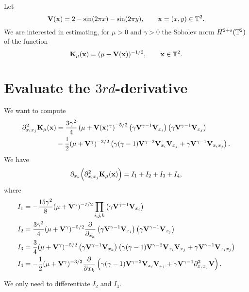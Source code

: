 
\noindent 
Let 
\begin{equation*}
    \mathbf{V}(\mathbf{x}) = 2-\sin(2\pi x) - \sin(2\pi y), \qquad \mathbf{x} = (x,y)\in \mathbb{T}^2.
\end{equation*}
We are interested in estimating, for $\mu>0$ and $\gamma > 0$ the Sobolev norm $H^{2+s}(\mathbb{T}^2)$ of the function
\begin{equation*}
    \mathbf{K}_\mu(\mathbf{x}) = (\mu + \mathbf{V}(\mathbf{x}))^{{-1/2}}, \qquad \mathbf{x}\in \mathbb{T}^2.
\end{equation*}

\section{Evaluate the $3rd$-derivative}
We want to compute 
\begin{align*}
    \partial^2_{x_ix_j} \mathbf{K}_\mu(\mathbf{x}) 
    &= \frac{3\gamma^2}{4}\left(\mu+\mathbf{V}(\mathbf{x})^\gamma\right)^{-5/2} 
        \left(\gamma \mathbf{V}^{\gamma-1} \mathbf{V}_{x_i}\right)
        \left(\gamma \mathbf{V}^{\gamma-1} \mathbf{V}_{x_j}\right) \\
    & -\frac{1}{2}(\mu + \mathbf{V}^\gamma)^{-3/2} 
        \left(
            \gamma(\gamma-1)\mathbf{V}^{\gamma-2}
            \mathbf{V}_{x_i}\mathbf{V}_{x_j}
            + 
            \gamma\mathbf{V}^{\gamma-1} \mathbf{V}_{x_ix_j}
        \right).
\end{align*}
We have 
\begin{align*}
    \partial_{x_k}\Big(\partial^2_{x_ix_j} \mathbf{K}_\mu(\mathbf{x}) \Big) = I_1 + I_2 + I_3 + I_4,
\end{align*}
where
\begin{align*}
    I_1 &= -\frac{15\gamma^2}{8} (\mu+\mathbf{V}^\gamma)^{-7/2} \prod_{i,j,k} \left(\gamma\mathbf{V}^{\gamma-1}\mathbf{V}_{x_i}\right) \\
    I_2 &= \frac{3\gamma^2}{4}(\mu+\mathbf{V}^\gamma)^{-5/2} \frac{\partial}{\partial_{x_k}} 
    \left(\gamma\mathbf{V}^{\gamma-1}\mathbf{V}_{x_i}\right)
    \left(\gamma\mathbf{V}^{\gamma-1}\mathbf{V}_{x_j}\right)\\
    I_3 &= \frac{3}{4}(\mu+\mathbf{V}^\gamma)^{-5/2} 
        \left( 
            \gamma\mathbf{V}^{\gamma-1}\mathbf{V}_{x_k} 
        \right)
        \left(
            \gamma(\gamma-1)\mathbf{V}^{\gamma-2}\mathbf{V}_{x_i}\mathbf{V}_{x_j}
            + 
            \gamma\mathbf{V}^{\gamma-1} \mathbf{V}_{x_ix_j}
        \right) \\
    I_4 &= -\frac{1}{2}(\mu+\mathbf{V}^\gamma)^{-3/2} \frac{\partial}{\partial x_k}
    \left(
        \gamma(\gamma-1)\mathbf{V}^{\gamma-2}
        \mathbf{V}_{x_i}\mathbf{V}_{x_j}
        + 
        \gamma\mathbf{V}^{\gamma-1} \partial^2_{x_ix_j}\mathbf{V}
    \right). 
\end{align*}

We only need to differentiate $I_2$ and $I_4$. 
